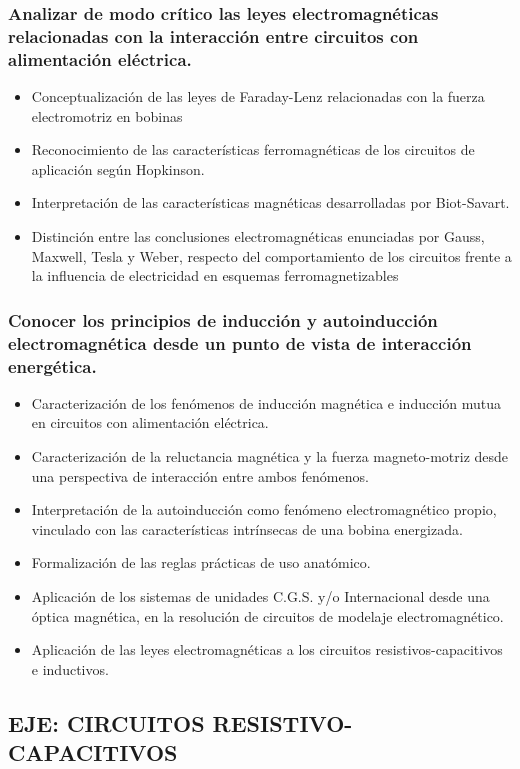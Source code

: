 \documentclass[../main]{subfiles}
\begin{document}
\subsubsection{Analizar de modo crítico las
leyes electromagnéticas
relacionadas con la interacción entre circuitos
con alimentación eléctrica.}
\begin{itemize}
    \item Conceptualización de las leyes de Faraday-Lenz relacionadas con la fuerza electromotriz en bobinas
    \item Reconocimiento de las características ferromagnéticas de
los circuitos de aplicación según Hopkinson.
\item  Interpretación de las características magnéticas
desarrolladas por Biot-Savart.
\item Distinción entre las conclusiones electromagnéticas
enunciadas por Gauss, Maxwell, Tesla y Weber, respecto
del comportamiento de los circuitos frente a la influencia
de electricidad en esquemas ferromagnetizables 
\end{itemize}
\subsubsection{Conocer los principios de
inducción y autoinducción
electromagnética desde un
punto de vista de
interacción energética. 
}
\begin{itemize}
    \item  Caracterización de los fenómenos de inducción
magnética e inducción mutua en circuitos con
alimentación eléctrica.
\item Caracterización de la reluctancia magnética y la fuerza
magneto-motriz desde una perspectiva de interacción
entre ambos fenómenos.
\item Interpretación de la autoinducción como fenómeno
electromagnético propio, vinculado con las características
intrínsecas de una bobina energizada.
\item Formalización de las reglas prácticas de uso anatómico.
\item Aplicación de los sistemas de unidades C.G.S. y/o
Internacional desde una óptica magnética, en la
resolución de circuitos de modelaje electromagnético.
\item Aplicación de las leyes electromagnéticas a los circuitos
resistivos-capacitivos e inductivos. 

\end{itemize}


\subsection{EJE: CIRCUITOS RESISTIVO- CAPACITIVOS }
\end{document}
